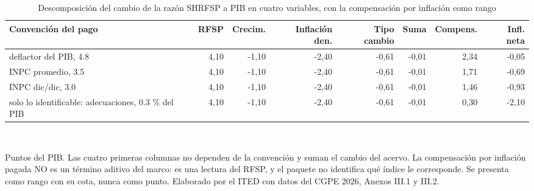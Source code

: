 \begin{table}[htbp]
\centering
\scriptsize
\caption{Descomposición del cambio de la razón SHRFSP a PIB en cuatro variables, con la compensación por inflación como rango}
\label{cua:C13_4}
\begin{tabular}{p{3.6cm}rrrrrrr}
\toprule
\textbf{Convención del pago} & \textbf{RFSP} & \textbf{Crecim.} & \textbf{Inflación den.} & \textbf{Tipo cambio} & \textbf{Suma} & \textbf{Compens.} & \textbf{Infl. neta} \\
\midrule
deflactor del PIB, 4.8 & 4,10 & -1,10 & -2,40 & -0,61 & -0,01 & 2,34 & -0,05 \\
INPC promedio, 3.5 & 4,10 & -1,10 & -2,40 & -0,61 & -0,01 & 1,71 & -0,69 \\
INPC dic/dic, 3.0 & 4,10 & -1,10 & -2,40 & -0,61 & -0,01 & 1,46 & -0,93 \\
solo lo identificable: adecuaciones, 0.3 \% del PIB & 4,10 & -1,10 & -2,40 & -0,61 & -0,01 & 0,30 & -2,10 \\
\bottomrule
\end{tabular}
\\[2pt]\begin{minipage}{0.92\textwidth}\scriptsize Puntos del PIB. Las cuatro primeras columnas no dependen de la convención y suman el cambio del acervo. La compensación por inflación pagada NO es un término aditivo del marco: es una lectura del RFSP, y el paquete no identifica qué índice le corresponde. Se presenta como rango con su cota, nunca como punto. Elaborado por el ITED con datos del CGPE 2026, Anexos III.1 y III.2.\end{minipage}
\end{table}
